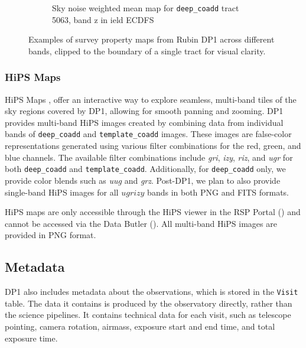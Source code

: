 \begin{figure}[hbt!]
\begin{subfigure}[t]{0.31\textwidth}
  \caption{Sky noise weighted mean map for \texttt{deep\_coadd} tract 5063, band z in ield ECDFS}
  \end{subfigure}\hfill
\caption{Examples of survey property maps from Rubin DP1 across different bands, clipped to the boundary of a single tract for visual clarity.}
  \label{fig:survey_property_maps}
\end{figure}

\subsubsection{HiPS Maps}
HiPS Maps \citep{2015A&A...578A.114F}, offer an interactive way to explore seamless, multi-band tiles of the sky regions covered by DP1, allowing for smooth panning and zooming. 
DP1 provides multi-band HiPS images created by combining data from individual bands of \texttt{deep\_coadd} and \texttt{template\_coadd} images. 
These images are false-color representations generated using various filter combinations for the red, green, and blue channels. 
The available filter combinations include \textit{gri}, \textit{izy}, \textit{riz}, and \textit{ugr} for both \texttt{deep\_coadd} and \texttt{template\_coadd}. 
Additionally, for \texttt{deep\_coadd} only, we provide color blends such as \textit{uug} and \textit{grz}.
Post-DP1, we plan to also provide single-band HiPS images for all $ugrizy$ bands in both PNG and FITS formats. 

HiPS maps are only accessible through the HiPS viewer in the RSP Portal () and cannot be accessed via the Data Butler ().
All multi-band HiPS images are provided in PNG format.

\subsection{Metadata
\label{ssec:metadata}}

DP1 also includes metadata about the observations, which is stored in the \texttt{Visit} table. The data it contains is produced by the observatory directly, rather than the science pipelines.
It contains technical data for each visit, such as telescope pointing, camera rotation, airmass, exposure start and end time, and total exposure time.

